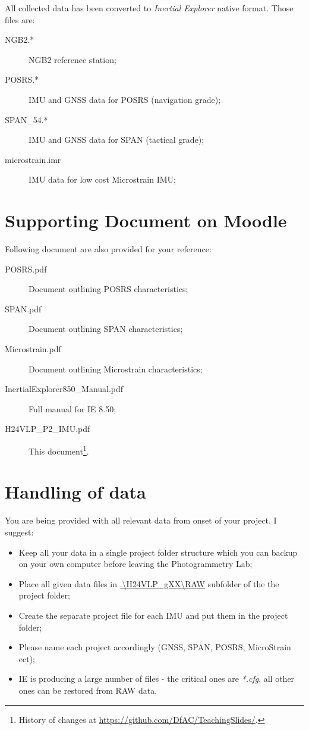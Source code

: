 \documentclass[11pt,fleqn]{book} %
\newcommand{\thisDocRef}{\footnote{History of changes at \url{https://github.com/DfAC/TeachingSlides/}.}}
\begin{document}
All collected data has been converted to \emph{Inertial Explorer} native format. Those files are:
	\begin{description}
	\item [{NGB2.{*}}] NGB2 reference station;
	\item [{POSRS.{*}}] IMU and GNSS data for POSRS (navigation grade);
	\item [{SPAN\_54.{*}}] IMU and GNSS data for SPAN (tactical grade);
	\item [{microstrain.imr}] IMU data for low cost Microstrain IMU;
	\end{description}


\section{Supporting Document on Moodle}

Following document are also provided for your reference:

	\begin{description}
	\item [{POSRS.pdf}] Document outlining POSRS characteristics;
	\item [{SPAN.pdf}] Document outlining SPAN characteristics;
	\item [{Microstrain.pdf}] Document outlining Microstrain characteristics;
	\item [{InertialExplorer850\_Manual.pdf}] Full manual for IE 8.50;
	\item [{H24VLP\_P2\_IMU.pdf}] This document\thisDocRef.
	\end{description}

\section{Handling of data}

You are being provided with all relevant data from onset of your project. I suggest:

\begin{itemize}
	\item Keep all your data in a single project folder structure which you can backup on your own computer before leaving the Photogrammetry Lab;
	\item Place all given data files in \url{.\H24VLP_gXX\RAW} subfolder of the the project folder;
	\item Create the separate project file for each IMU and put them in the project folder;
	\item Please name each project accordingly (GNSS, SPAN, POSRS, MicroStrain ect); 
	\item IE is producing a large number of files - the critical ones are \textit{*.cfg}, all other ones can be restored from RAW data.
\end{itemize}
\end{document}
